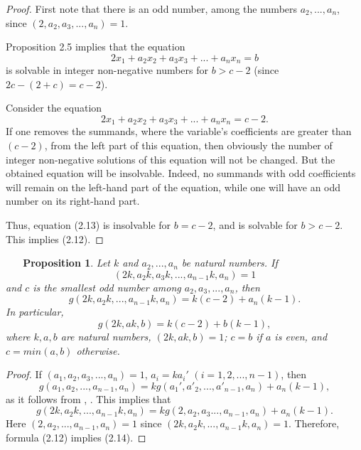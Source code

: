 \documentclass[12pt,reqno,intlim]{amsart}
\numberwithin{equation}{section}
\newtheorem{prop}[theo]{\ \ \ Proposition}
\theoremstyle{definition}
\theoremstyle{remark}
\begin{document}
\begin{proof}
First note that there is an odd number, among the numbers $a_2,...,a_n$, since $(2,a_2,a_3,...,a_n)=1$. 

Proposition 2.5 implies that the equation
\begin{equation}
2x_1+a_2x_2+a_3x_3+...+a_nx_n=b
\end{equation}
is solvable in integer non-negative numbers for $b>c-2$ (since $2c-(2+c)=c-2$).

Consider the equation
$$2x_1+a_2x_2+a_3x_3+...+a_nx_n=c-2.$$
If one removes the summands, where the variable's coefficients are greater than $(c-2)$, from the left part of this equation, then obviously the number of integer non-negative solutions of this equation will not be changed. But the obtained equation will be insolvable. Indeed, no summands with odd coefficients will remain on the left-hand part of the equation, while one will have an odd number on its right-hand part.

Thus, equation (2.13) is insolvable for $b=c-2$, and is solvable for $b>c-2$. This implies (2.12).
\end{proof}

\begin{prop}
Let $k$ and $a_2,...,a_n$ be natural numbers. If $$(2k,a_2k,a_3k,...,a_{n-1}k,a_n)=1$$ and $c$ is the smallest odd number among $a_2,a_3,...,a_n$, then
\begin{equation}
g(2k,a_2k,...,a_{n-1}k,a_n)=k(c-2)+a_n(k-1).
\end{equation}
In particular, 
\begin{equation}
g(2k,ak,b)=k(c-2)+b(k-1),
\end{equation}
where $k,a,b$ are natural numbers, $(2k,ak,b)=1$; $c=b$ if $a$ is even, and $c=min(a,b)$ otherwise.
\end{prop}

\begin{proof}
If $(a_1,a_2,a_3,...,a_n)=1$, $a_i=ka_i'$ $(i=1,2,...,n-1)$, then 
$$g(a_1,a_2,...,a_{n-1},a_n)=kg(a_1',a'_2,...,a'_{n-1},a_n)+a_n(k-1),$$
as it follows from \cite{J}, \cite{BS}. This implies that
$$g(2k,a_2k,...,a_{n-1}k,a_n)=kg(2,a_2,a_3...,a_{n-1},a_n)+a_n(k-1).$$
Here $(2,a_2,...,a_{n-1},a_n)=1$ since $(2k,a_2k,...,a_{n-1}k,a_n)=1.$ Therefore, formula (2.12) implies (2.14).
\end{proof}




\end{document}
